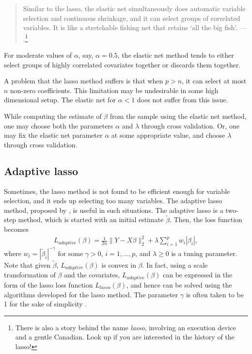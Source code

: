 \documentclass[
]{book}
\begin{document}
\begin{quote}
Similar to the lasso, the elastic net simultaneously does automatic variable selection and continuous shrinkage, and it can select groups of correlated variables. It is like a stretchable fishing net that retains `all the big fish'.
--- \citet{zou2005regularization}.\footnote{There is also a story behind the name \emph{lasso}, involving an execution device and a gentle Canadian. Look up \citet{tibshirani2011regression} if you are interested in the history of the lasso!}
\end{quote}

For moderate values of \(\alpha\), say, \(\alpha = 0.5\), the elastic net method tends to either select groups of highly correlated covariates together or discards them together.

A problem that the lasso method suffers is that when \(p > n\), it can select at most \(n\) non-zero coefficients. This limitation may be undesirable in some high dimensional setup. The elastic net for \(\alpha < 1\) does not suffer from this issue.

While computing the estimate of \(\beta\) from the sample using the elastic net method, one may choose both the parameters \(\alpha\) and \(\lambda\) through cross validation. Or, one may fix the elastic net parameter \(\alpha\) at some appropriate value, and choose \(\lambda\) through cross validation.

\hypertarget{adaptivelasso-description}{%
\subsection{Adaptive lasso}\label{adaptivelasso-description}}

Sometimes, the lasso method is not found to be efficient enough for variable selection, and it ends up selecting too many variables. The adaptive lasso method, proposed by \citet{zou2006adaptive}, is useful in such situations. The adaptive lasso is a two-step method, which is started with an initial estimate \(\tilde{\beta}\). Then, the loss function becomes
\begin{align*}
L_{adaptive}(\beta) = \frac{1}{2n} \| Y - X \beta \|^2_2 + \lambda \sum_{i=1}^p w_i | \beta_i | ,
\end{align*}
where \(w_i = \left| \tilde{\beta}_i \right|^{-\gamma}\) for some \(\gamma > 0\), \(i = 1, \ldots, p\), and \(\lambda \ge 0\) is a tuning parameter. Note that given \(\tilde{\beta}\), \(L_{adaptive}(\beta)\) is convex in \(\beta\). In fact, using a scale transformation of \(\beta\) and the covariates, \(L_{adaptive}(\beta)\) can be expressed in the form of the lasso loss function \(L_{lasso}(\beta)\), and hence can be solved using the algorithms developed for the lasso method. The parameter \(\gamma\) is often taken to be 1 for the sake of simplicity \citep{buhlmann2011statistics}.
\end{document}
